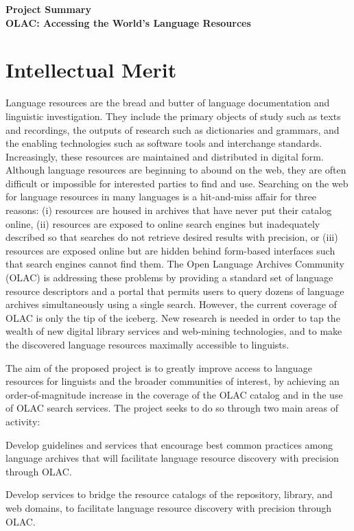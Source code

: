 \documentclass[11pt]{nsf}
\begin{document}
\begin{center}\textbf{\Large
Project Summary\\[2ex]
    OLAC: Accessing the World's Language Resources
}\end{center}

\section*{Intellectual Merit}

%
%
Language resources are the bread and butter of
language documentation and linguistic investigation.
They include
the primary objects of study such as texts and recordings,
the outputs of research such as dictionaries and grammars,
and the enabling technologies such as software tools and interchange standards.
Increasingly, these resources are maintained and distributed in
digital form.
%
%
Although language resources are beginning to abound on the web,
they are often difficult or impossible for interested parties to find and use.
Searching on the web for language resources in many languages
is a hit-and-miss affair for three reasons:
(i) resources are housed in archives that have never put their catalog online,
(ii) resources are exposed to online search engines but inadequately described
so that searches do not retrieve desired results with precision, or
(iii) resources are exposed online but are hidden behind form-based interfaces 
such that search engines cannot find them.
%
%
The Open Language Archives Community (OLAC) is addressing these
problems by providing a standard set of language resource descriptors
and a portal that permits users to query dozens of language archives
simultaneously using a single search.  However, the current coverage
of OLAC is only the tip of the iceberg.  New research 
is needed in order to tap the wealth of
new digital library services and web-mining technologies, and
to make the discovered language resources maximally accessible to linguists.

%
%
The aim of the proposed project is to greatly improve access to
language resources for linguists and the broader communities of
interest, by achieving an order-of-magnitude increase in the coverage
of the OLAC catalog and in the use of OLAC search services.  The
project seeks to do so through two main areas of activity:
%
\begin{description}\setlength{\itemsep}{0pt}\setlength{\parskip}{0pt}
  \item[Access to Language Resources in Archives:]
    Develop guidelines and services that encourage best common
    practices among language archives that will 
    facilitate language resource discovery with precision through OLAC.

  \item[Access to Language Resources on the Web:]
    Develop services to bridge the resource catalogs of the
    repository, library, and web domains,
    to facilitate language resource discovery with precision through OLAC.

\end{description}
\end{document}

